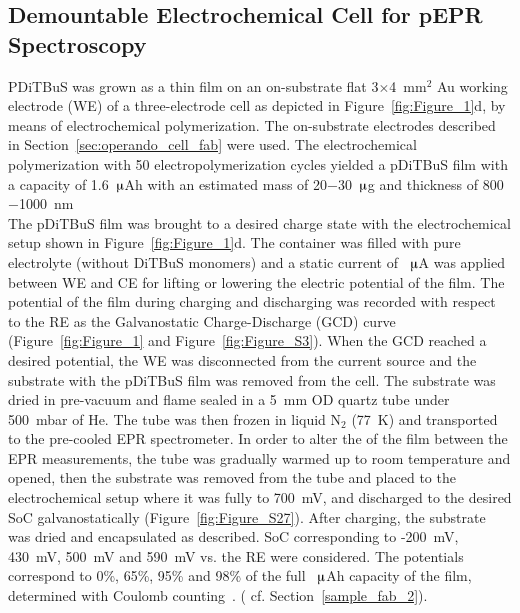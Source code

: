 \subsection{Demountable Electrochemical Cell for pEPR Spectroscopy}
\label{fab:ex_situ_charging}



PDiTBuS was grown as a thin film on an on-substrate flat 3$\times$4~mm$^2$ Au working electrode (WE) of a three-electrode cell as depicted in Figure~\ref{fig:Figure_1}d, by means of electrochemical polymerization. The on-substrate electrodes described in Section~\ref{sec:operando_cell_fab} were used. The electrochemical polymerization with 50 electropolymerization cycles yielded a pDiTBuS film with a capacity of 1.6~$\muup$Ah with an estimated mass of 20$-$30~$\muup$g and thickness of 800$-$1000~nm \\

The pDiTBuS film was brought to a desired charge state with the electrochemical setup shown in Figure~\ref{fig:Figure_1}d. The container was filled with pure electrolyte (without DiTBuS monomers) and a static current of ~$\muup$A was applied between WE and CE for lifting or lowering the electric potential of the film. The potential of the film during charging and discharging was recorded with respect to the RE as the Galvanostatic Charge-Discharge (GCD) curve (Figure~\ref{fig:Figure_1} and Figure~\ref{fig:Figure_S3}). When the GCD reached a desired potential, the WE was disconnected from the current source and the substrate with the pDiTBuS film was removed from the cell. The substrate was dried in pre-vacuum and flame sealed in a 5~mm OD quartz tube under 500~mbar of He. The tube was then  frozen in liquid N$_2$ (77~K) and transported to the pre-cooled EPR spectrometer. In order to alter the  of the film between the EPR measurements, the tube was gradually warmed up to room temperature and opened, then the substrate  was removed from the tube and placed to the electrochemical setup where it was fully  to 700~mV, and discharged to the  desired SoC galvanostatically (Figure~\ref{fig:Figure_S27}). After charging, the substrate was dried and encapsulated as described. SoC corresponding to -200~mV, 430~mV, 500~mV and 590~mV vs. the RE were considered. The potentials correspond to 0\%, 65\%, 95\% and 98\% of the full ~$\muup$Ah  capacity of the film, determined with Coulomb counting~\cite{Movassagh2021}. ( cf. Section~\ref{sample_fab_2}).\\

